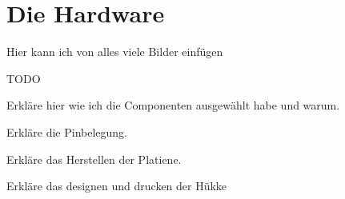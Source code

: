 \section{Die Hardware}

Hier kann ich von alles viele Bilder einfügen

TODO 

Erkläre hier wie ich die Componenten ausgewählt habe und warum.

Erkläre die Pinbelegung.

Erkläre das Herstellen der Platiene.

Erkläre das designen und drucken der Hükke

